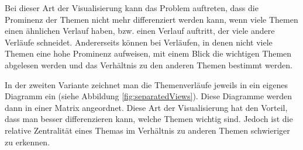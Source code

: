 Bei dieser Art der Visualisierung kann das Problem auftreten, dass die Prominenz der Themen nicht mehr differenziert werden kann, wenn viele Themen einen ähnlichen Verlauf haben, bzw. einen Verlauf auftritt, der viele andere Verläufe schneidet. Andererseits können bei Verläufen, in denen nicht viele Themen eine hohe Prominenz aufweisen, mit einem Blick die wichtigen Themen abgelesen werden und das Verhältnis zu den anderen Themen bestimmt werden.

In der zweiten Variante zeichnet man die Themenverläufe jeweils in ein eigenes Diagramm ein (siehe Abbildung \ref{fig:separatedViews}). Diese Diagramme werden dann in einer Matrix angeordnet. Diese Art der Visualisierung hat den Vorteil, dass man besser differenzieren kann, welche Themen wichtig sind. Jedoch ist die relative Zentralität eines Themas im Verhältnis zu anderen Themen schwieriger zu erkennen.
